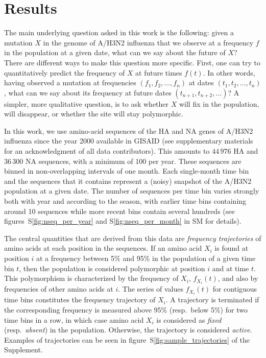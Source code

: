 \documentclass[reprint,amsmath,amssymb,superscriptaddress,showpacs,pre]{revtex4-1}
\newcommand{\sref}[1]{S\ref{#1}}
\begin{document}


\section*{Results} %
\label{sec:results}

The main underlying question asked in this work is the following: given a mutation $X$ in the genome of A/H3N2 influenza that we observe at a frequency $f$ in the population at a given date, what can we say about the future of $X$?  \\
There are different ways to make this question more specific. First, one can try to quantitatively predict the frequency of $X$ at future times $f(t)$. In other words, having observed a mutation at frequencies $(f_1, f_2,\ldots,f_n)$ at dates $(t_1,t_2,\ldots,t_n)$, what can we say about its frequency at future dates $(t_{n+1}, t_{n+2},\ldots)$?
A simpler, more qualitative question, is to ask whether $X$ will fix in the population, will disappear, or whether the site will stay polymorphic. 

In this work, we use amino-acid sequences of the HA and NA genes of A/H3N2 influenza since the year 2000 available in GISAID \citep{shu2017gisaid} (see supplementary materials for an acknowledgment of all data contributors). 
This amounts to $44\,976$ HA and $36\,300$ NA sequences, with a minimum of 100 per year. These sequences are binned in non-overlapping intervals of one month. Each single-month time bin and the sequences that it contains represent a (noisy) snapshot of the A/H3N2 population at a given date. The number of sequences per time bin varies strongly both with year and according to the season, with earlier time bins containing around 10 sequences while more recent bins contain several hundreds (see figures~\sref{fig:nseq_per_year} and \sref{fig:nseq_per_month} in SM for details).

The central quantities that are derived from this data are \emph{frequency trajectories} of amino acids at each position in the sequences. If an amino acid $X_i$ is found at position $i$ at a frequency between 5\% and 95\% in the population of a given time bin $t$, then the population is considered polymorphic at position $i$ and at time $t$. This polymorphism is characterized by the frequency of $X_i$, $f_{X_i}(t)$, and also by frequencies of other amino acids at $i$. The series of values $f_{X_i}(t)$ for contiguous time bins constitutes the frequency trajectory of $X_i$. A trajectory is terminated if the corresponding frequency is measured above 95\% (resp.~below 5\%) for two time bins in a row, in which case amino acid $X_i$ is considered as \emph{fixed} (resp.~\emph{absent}) in the population. Otherwise, the trajectory is considered \emph{active}. Examples of trajectories can be seen in figure~\sref{fig:sample_trajectories} of the Supplement.
\end{document}
